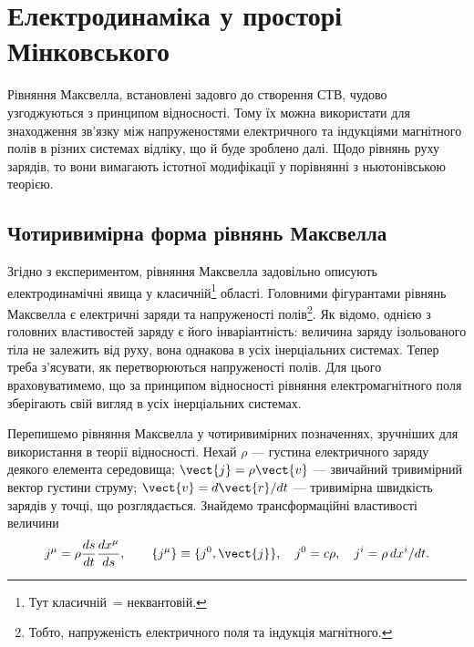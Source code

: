 


\chapter{Електродинаміка у просторі Мінковського}\label{\currfilebase}

Рівняння Максвелла, встановлені задовго до створення СТВ, чудово узгоджуються з принципом відносності. Тому їх можна
використати для знаходження зв'язку між напруженостями електричного та індукціями магнітного полів в різних системах
відліку, що й буде зроблено далі. Щодо рівнянь руху зарядів, то вони вимагають істотної модифікації у порівнянні з
ньютонівською теорією.

\section{Чотиривимірна форма рівнянь Максвелла}

Згідно з експериментом, рівняння Максвелла задовільно описують електродинамічні явища у класичній\footnote{Тут
    класичній~= неквантовій.} області. Головними фігурантами рівнянь Максвелла є електричні заряди та напруженості
полів\footnote{Тобто, напруженість електричного поля та індукція магнітного.}. Як відомо, однією з головних властивостей
заряду є його інваріантність: величина заряду ізольованого тіла не залежить від руху, вона однакова в усіх інерціальних
системах. Тепер треба з'ясувати, як перетворюються напруженості полів. Для цього враховуватимемо, що за принципом
відносності рівняння електромагнітного поля зберігають свій вигляд в усіх інерціальних системах.

Перепишемо рівняння Максвелла у чотиривимірних позначеннях, зручніших для використання в теорії відносності. Нехай
$\rho$ --- густина електричного заряду деякого елемента середовища; $\vect{j}=\rho\vect{v}$ --- звичайний тривимірний
вектор густини струму; $\vect{v}=d\vect{r}/dt$ --- тривимірна швидкість зарядів у точці, що розглядається. Знайдемо
трансформаційні властивості величини
\begin{equation*}
    j^{\mu} = \rho\frac{ds}{dt}\frac{dx^{\mu}}{ds},
    \qquad
    \{j^{\mu}\} \equiv \{j^{0},\vect{j}\},\quad
    j^{0} = c\rho,\quad
    j^{i} = \rho\,dx^{i}/dt.
\end{equation*}

